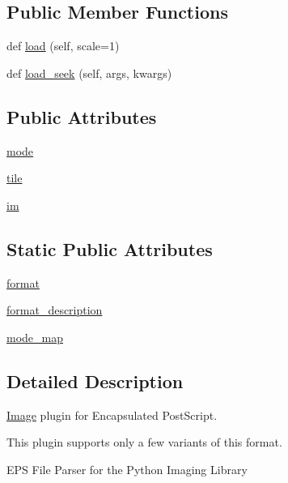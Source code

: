\subsection*{Public Member Functions}
\begin{DoxyCompactItemize}
\item 
def \hyperlink{classPIL_1_1EpsImagePlugin_1_1EpsImageFile_a8f4abf25b6a6abe78fb7f25b5818e0fa}{load} (self, scale=1)
\item 
def \hyperlink{classPIL_1_1EpsImagePlugin_1_1EpsImageFile_aa7f8959710f67519911ad7485bd20d73}{load\+\_\+seek} (self, args, kwargs)
\end{DoxyCompactItemize}
\subsection*{Public Attributes}
\begin{DoxyCompactItemize}
\item 
\hyperlink{classPIL_1_1EpsImagePlugin_1_1EpsImageFile_af4f7db5d558eb8ce448b91d0d69c2ebc}{mode}
\item 
\hyperlink{classPIL_1_1EpsImagePlugin_1_1EpsImageFile_ab36ec0d21d84e8d9352bdca55aa3ffb6}{tile}
\item 
\hyperlink{classPIL_1_1EpsImagePlugin_1_1EpsImageFile_a289383849d0d4fcb17695c2be623266e}{im}
\end{DoxyCompactItemize}
\subsection*{Static Public Attributes}
\begin{DoxyCompactItemize}
\item 
\hyperlink{classPIL_1_1EpsImagePlugin_1_1EpsImageFile_a91a13b1cb8554e38e403ca6caa19515c}{format}
\item 
\hyperlink{classPIL_1_1EpsImagePlugin_1_1EpsImageFile_a49be4559e9883de513de92fd7d5ef258}{format\+\_\+description}
\item 
\hyperlink{classPIL_1_1EpsImagePlugin_1_1EpsImageFile_aff8452cf4445d3f14df08ab2c2fd0490}{mode\+\_\+map}
\end{DoxyCompactItemize}


\subsection{Detailed Description}
\hyperlink{namespacePIL_1_1Image}{Image} plugin for Encapsulated Post\+Script. 

This plugin supports only a few variants of this format. \begin{DoxyVerb}EPS File Parser for the Python Imaging Library\end{DoxyVerb}
 

